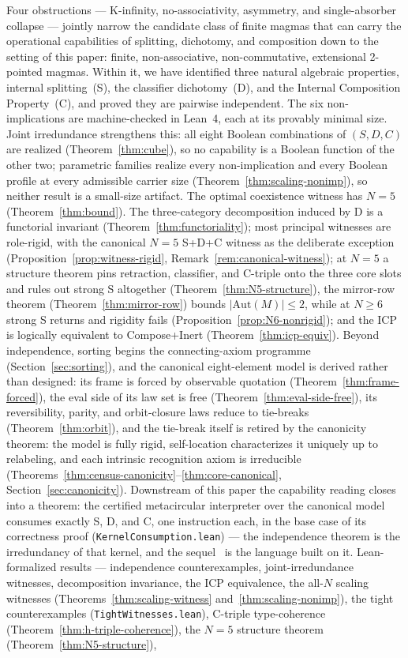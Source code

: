\documentclass[sigconf,screen]{acmart}
\theoremstyle{remark}
\begin{document}
Four obstructions --- K-infinity, no-associativity, asymmetry, and single-absorber collapse --- jointly narrow the candidate class of finite magmas that can carry the operational capabilities of splitting, dichotomy, and composition down to the setting of this paper: finite, non-associative, non-commutative, extensional 2-pointed magmas. Within it, we have identified three natural algebraic properties, internal splitting~(S), the classifier dichotomy~(D), and the Internal Composition Property~(C), and proved they are pairwise independent. The six non-implications are machine-checked in Lean~4, each at its provably minimal size. Joint irredundance strengthens this: all eight Boolean combinations of $(S, D, C)$ are realized (Theorem~\ref{thm:cube}), so no capability is a Boolean function of the other two; parametric families realize every non-implication and every Boolean profile at every admissible carrier size (Theorem~\ref{thm:scaling-nonimp}), so neither result is a small-size artifact. The optimal coexistence witness has $N\!=\!5$ (Theorem~\ref{thm:bound}). The three-category decomposition induced by D is a functorial invariant (Theorem~\ref{thm:functoriality}); most principal witnesses are role-rigid, with the canonical $N\!=\!5$ S+D+C witness as the deliberate exception (Proposition~\ref{prop:witness-rigid}, Remark~\ref{rem:canonical-witness}); at $N\!=\!5$ a structure theorem pins retraction, classifier, and C-triple onto the three core slots and rules out strong S altogether (Theorem~\ref{thm:N5-structure}), the mirror-row theorem (Theorem~\ref{thm:mirror-row}) bounds $|\mathrm{Aut}(M)| \leq 2$, while at $N \geq 6$ strong S returns and rigidity fails (Proposition~\ref{prop:N6-nonrigid}); and the ICP is logically equivalent to Compose+Inert (Theorem~\ref{thm:icp-equiv}). Beyond independence, sorting begins the connecting-axiom programme (Section~\ref{sec:sorting}), and the canonical eight-element model is derived rather than designed: its frame is forced by observable quotation (Theorem~\ref{thm:frame-forced}), the eval side of its law set is free (Theorem~\ref{thm:eval-side-free}), its reversibility, parity, and orbit-closure laws reduce to tie-breaks (Theorem~\ref{thm:orbit}), and the tie-break itself is retired by the canonicity theorem: the model is fully rigid, self-location characterizes it uniquely up to relabeling, and each intrinsic recognition axiom is irreducible (Theorems~\ref{thm:census-canonicity}--\ref{thm:core-canonical}, Section~\ref{sec:canonicity}). Downstream of this paper the capability reading closes into a theorem: the certified metacircular interpreter over the canonical model consumes exactly S, D, and C, one instruction each, in the base case of its correctness proof (\texttt{KernelConsumption.lean}) --- the independence theorem is the irredundancy of that kernel, and the sequel~\cite{companion-pearl} is the language built on it. Lean-formalized results --- independence counterexamples, joint-irredundance witnesses, decomposition invariance, the ICP equivalence, the all-$N$ scaling witnesses (Theorems~\ref{thm:scaling-witness} and~\ref{thm:scaling-nonimp}), the tight counterexamples (\texttt{TightWitnesses.lean}), C-triple type-coherence (Theorem~\ref{thm:h-triple-coherence}), the $N\!=\!5$ structure theorem (Theorem~\ref{thm:N5-structure}), 
\end{document}
